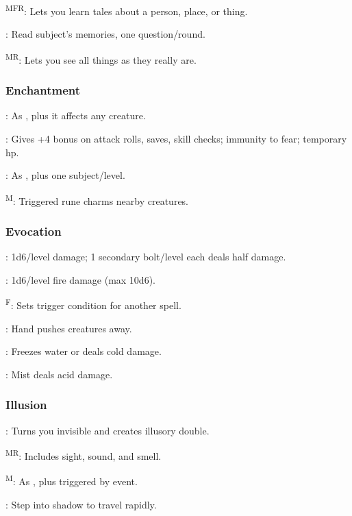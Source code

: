 	\textsuperscript{MFR}: Lets you learn tales about a person, place, or thing.

	: Read subject's memories, one question/round.

	\textsuperscript{MR}: Lets you see all things as they really are.

\subsubsection{Enchantment}
	: As , plus it affects any creature.

	: Gives +4 bonus on attack rolls, saves, skill checks; immunity to fear; temporary hp.

	: As , plus one subject/level.

	\textsuperscript{M}: Triggered rune charms nearby creatures.

\subsubsection{Evocation}
	: 1d6/level damage; 1 secondary bolt/level each deals half damage.

	: 1d6/level fire damage (max 10d6). %

	\textsuperscript{F}: Sets trigger condition for another spell.

	: Hand pushes creatures away.

	: Freezes water or deals cold damage.

	: Mist deals acid damage. %

\subsubsection{Illusion}
	: Turns you invisible and creates illusory double.

	\textsuperscript{MR}: Includes sight, sound, and smell.

	\textsuperscript{M}: As , plus triggered by event.

	: Step into shadow to travel rapidly.

